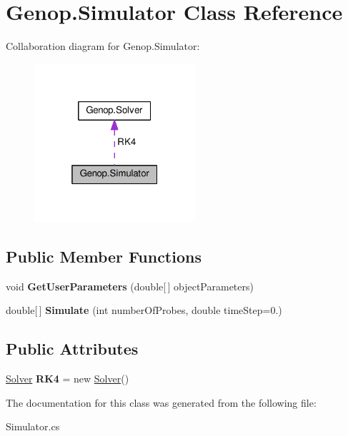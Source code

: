 \hypertarget{classGenop_1_1Simulator}{}\section{Genop.\+Simulator Class Reference}
\label{classGenop_1_1Simulator}


Collaboration diagram for Genop.\+Simulator\+:
\nopagebreak
\begin{figure}[H]
\begin{center}
\leavevmode
\includegraphics[width=169pt]{classGenop_1_1Simulator__coll__graph}
\end{center}
\end{figure}
\subsection*{Public Member Functions}
\begin{DoxyCompactItemize}
\item 
void {\bfseries Get\+User\+Parameters} (double\mbox{[}$\,$\mbox{]} object\+Parameters)\hypertarget{classGenop_1_1Simulator_a4bed492f372adb3bfb577a5caf7a143a}{}\label{classGenop_1_1Simulator_a4bed492f372adb3bfb577a5caf7a143a}

\item 
double\mbox{[}$\,$\mbox{]} {\bfseries Simulate} (int number\+Of\+Probes, double time\+Step=0.)\hypertarget{classGenop_1_1Simulator_ac3228946a174bafc232038ee2f74141c}{}\label{classGenop_1_1Simulator_ac3228946a174bafc232038ee2f74141c}

\end{DoxyCompactItemize}
\subsection*{Public Attributes}
\begin{DoxyCompactItemize}
\item 
\hyperlink{classGenop_1_1Solver}{Solver} {\bfseries R\+K4} = new \hyperlink{classGenop_1_1Solver}{Solver}()\hypertarget{classGenop_1_1Simulator_af3757fb33e92dbf3a883156d7289d6ec}{}\label{classGenop_1_1Simulator_af3757fb33e92dbf3a883156d7289d6ec}

\end{DoxyCompactItemize}


The documentation for this class was generated from the following file\+:\begin{DoxyCompactItemize}
\item 
Simulator.\+cs\end{DoxyCompactItemize}
